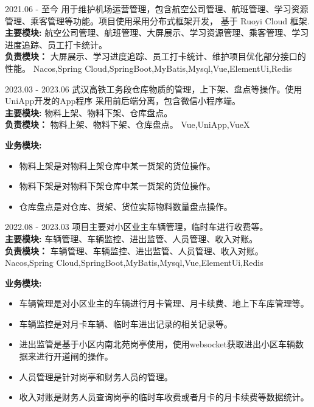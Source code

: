 \documentclass[zh]{resume}
\begin{document}
\begin{projects}
	\project
  {\color{accentcolor}{机场运营管理}}{2021.06 - 至今}
  {
    用于维护机场运营管理，包含航空公司管理、航班管理、学习资源管理、乘客管理等功能。项目使用采用分布式框架开发，
    基于 Ruoyi Cloud 框架. \\
  {\textbf{主要模块: } 航空公司管理、航班管理、大屏展示、学习资源管理、乘客管理、学习进度追踪、员工打卡统计。} \\
  {\textbf{负责模块：} 大屏展示、学习进度追踪、员工打卡统计、维护项目优化部分接口的性能。}
  }
  {Nacos,Spring Cloud,SpringBoot,MyBatis,Mysql,Vue,ElementUi,Redis}

	\project
  {\color{accentcolor}{武汉高铁工务段仓库APP}}{2023.03 - 2023.06}
  {
    武汉高铁工务段仓库物质的管理，上下架、盘点等操作。使用UniApp开发的App程序
    采用前后端分离，包含微信小程序端。\\ 
    {\textbf{主要模块: } 物料上架、物料下架、仓库盘点。} \\
    {\textbf{负责模块：} 物料上架、物料下架、仓库盘点。}
  }
  {Vue,UniApp,VueX}
  {
    {\textbf{业务模块:}}
    \begin{itemize}
      \item 物料上架是对物料上架仓库中某一货架的货位操作。
      \item 物料下架是对物料下架仓库中某一货架的货位操作。
      \item 仓库盘点是对仓库、货架、货位实际物料数量盘点操作。
    \end{itemize}
  }

	\project
  {\color{accentcolor}{中谷苑车辆道闸系统}}{2022.08 - 2023.03}
  {
    项目主要对小区业主车辆管理，临时车进行收费等。 \\
    {\textbf{主要模块: } 车辆管理、车辆监控、进出监管、人员管理、收入对账。} \\
    {\textbf{负责模块：} 车辆管理、车辆监控、进出监管、人员管理、收入对账。}
  }
  {Nacos,Spring Cloud,SpringBoot,MyBatis,Mysql,Vue,ElementUi,Redis}
  {
    {\textbf{业务模块:}}
    \begin{itemize}
      \item 车辆管理是对小区业主的车辆进行月卡管理、月卡续费、地上下车库管理等。
      \item 车辆监控是对月卡车辆、临时车进出记录的相关记录等。
      \item 进出监管是基于小区内南北苑岗亭使用，使用websocket获取进出小区车辆数据来进行开道闸的操作。
      \item 人员管理是针对岗亭和财务人员的管理。
      \item 收入对账是财务人员查询岗亭的临时车收费或者月卡的月卡续费等数据统计。
    \end{itemize}
  }


\end{projects}
\end{document}
